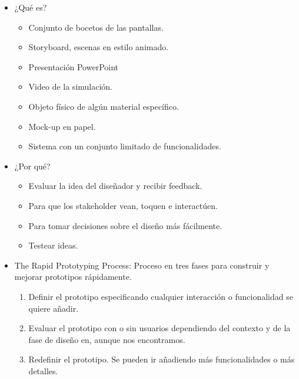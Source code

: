 \documentclass[12pt, twoside, openright]{report} %
\begin{document}
    \begin{itemize}
    
    \item
      ¿Qué es?

      \begin{itemize}
      
      \item
        Conjunto de bocetos de las pantallas.
      \item
        Storyboard, escenas en estilo animado.
      \item
        Presentación PowerPoint
      \item
        Video de la simulación.
      \item
        Objeto físico de algún material específico.
      \item
        Mock-up en papel.
      \item
        Sistema con un conjunto limitado de funcionalidades.
      \end{itemize}
    \item
      ¿Por qué?

      \begin{itemize}
      
      \item
        Evaluar la idea del diseñador y recibir feedback.
      \item
        Para que los stakeholder vean, toquen e interactúen.
      \item
        Para tomar decisiones sobre el diseño más fácilmente.
      \item
        Testear ideas.
      \end{itemize}
    \item
      The Rapid Prototyping Process: Proceso en tres fases para
      construir y mejorar prototipos rápidamente.

      \begin{enumerate}
      \def\labelenumi{\arabic{enumi}.}
      
      \item
        Definir el prototipo especificando cualquier interacción o
        funcionalidad se quiere añadir.
      \item
        Evaluar el prototipo con o sin usuarios dependiendo del contexto
        y de la fase de diseño en, aunque nos encontramos.
      \item
        Redefinir el prototipo. Se pueden ir añadiendo más
        funcionalidades o más detalles.
      \end{enumerate}


\end{itemize}
\end{document}
